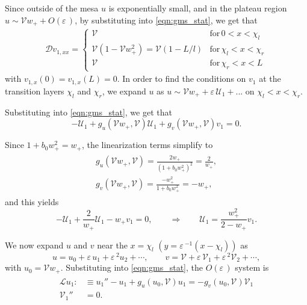 \documentclass[a4paper,10pt]{article}
\newcommand{\Ep}{\ensuremath{\varepsilon\,}}
\newcommand{\DD}{\ensuremath{\mathcal{D}}}
\newcommand{\VV}{\ensuremath{\mathcal{V}}}
\newcommand{\UU}{\ensuremath{\mathcal{U}}}
\newcommand{\LL}{\ensuremath{\mathcal{L}}}
\begin{document}
Since outside of the mesa $u$ is exponentially small, and in the plateau region $u\sim\VV w_+ + O(\Ep)$, by substituting into \eqref{eqn:gms_stat}, we get that
% 
\begin{equation}
\label{eqn:v1}
	\begin{split}
	\DD v_{1,xx}
   = \left\{
	\begin{matrix}
		\VV& \mathrm{for}\hspace{2pt}0< x<\chi_l \\
		\VV(1-\VV w_+^2) = \VV(1-L/l)& \mathrm{for}\hspace{2pt}\chi_l< x<\chi_r\\
		\VV& \mathrm{for}\hspace{2pt}\chi_r<x<L
	\end{matrix}\right.
	\end{split}
\end{equation}
% 
with $v_{1,x}(0) = v_{1,x}(L) = 0$. In order to find the conditions on $v_1$ at the transition layers $\chi_l$ and $\chi_r$, we expand $u$ as $u\sim\VV w_+ + \Ep\UU_1 + ...$ on $\chi_l<x<\chi_r$.

Substituting into \eqref{eqn:gms_stat}, we get that 
$$
-\UU_1 + g_u(\VV w_+,\VV)\UU_1 + g_v(\VV w_+,\VV)v_1 = 0.
$$

Since $1+b_0w_+^2 = w_+$, the linearization terms simplify to
% 
\begin{equation}
\label{eqn:derivs}
\begin{split}
\begin{aligned}
  g_u(\VV w_+,\VV) = \frac{2w_+}{(1+b_0w_+^2)^2} = \frac{2}{w_+},\\
  g_v(\VV w_+,\VV) = \frac{-w_+^2}{1+b_0w_+^2} = -w_+,
\end{aligned}
\end{split}
\end{equation}
% 
and this yields
$$
-\UU_1 + \frac{2}{w_+}\UU_1 - w_+v_1 = 0,\qquad \Rightarrow \qquad \UU_1 = \frac{w_+^2}{2-w_+}v_1.
$$

We now expand $u$ and $v$ near the $x=\chi_l$ $(y=\Ep^{-1}(x-\chi_l))$ as
% 
\begin{equation}
  u = u_0 + \Ep u_1 + \Ep^2 u_2+ \cdots,\qquad v = \VV + \Ep\VV_1 + \Ep^2\VV_2+\cdots,
\end{equation}
% 
with $u_0 = \VV w_+$. Substituting into \eqref{eqn:gms_stat}, the $O(\Ep)$ system is
% 
\begin{equation}
\label{eqn:ord_epsilon}
\begin{split}
\begin{aligned}
  \LL u_1:&\equiv u_1''-u_1 + g_u(u_0,\VV)u_1 = -g_v(u_0,\VV)\VV_1 \\
  \VV_1'' &= 0.
\end{aligned}
\end{split}
\end{equation}
% 
\end{document}

